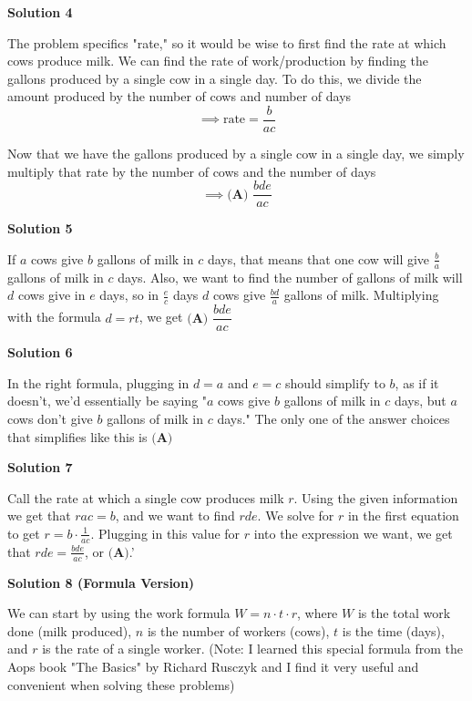 \begin{enumerate}
\textbf{Solution 4}

The problem specifics "rate," so it would be wise to first find the rate at which cows produce milk. We can find the rate of work/production by finding the gallons produced by a single cow in a single day. To do this, we divide the amount produced by the number of cows and number of days 
 \[\implies\text{rate}=\dfrac{b}{ac}\]

 Now that we have the gallons produced by a single cow in a single day, we simply multiply that rate by the number of cows and the number of days 
 \[\implies\boxed{\textbf{(A) } \dfrac{bde}{ac}}\]




\textbf{Solution 5}

If $a$ cows give $b$ gallons of milk in $c$ days, that means that one cow will give $\frac{b}{a}$ gallons of milk in $c$ days. Also, we want to find the number of gallons of milk will $d$ cows give in $e$ days, so in $\frac{e}{c}$ days $d$ cows give $\frac{bd}{a}$ gallons of milk. Multiplying with the formula $d=rt$, we get $\boxed{\textbf{(A) } \dfrac{bde}{ac}}$




\textbf{Solution 6}

In the right formula, plugging in $d=a$ and $e=c$ should simplify to $b$, as if it doesn't, we'd essentially be saying "$a$ cows give $b$ gallons of milk in $c$ days, but $a$ cows don't give $b$ gallons of milk in $c$ days." The only one of the answer choices that simplifies like this is $\boxed{\textbf{(A)}}$




\textbf{Solution 7}

Call the rate at which a single cow produces milk $r$. Using the given information we get that $rac=b$, and we want to find $rde$. We solve for $r$ in the first equation to get $r=b \cdot \frac{1}{ac}$. Plugging in this value for $r$ into the expression we want, we get that $rde=\frac{bde}{ac}$, or $\boxed{\textbf{(A)}}$.'

 



\textbf{Solution 8 (Formula Version)}

We can start by using the work formula $W = n \cdot t \cdot r$, where $W$ is the total work done (milk produced), $n$ is the number of workers (cows), $t$ is the time (days), and $r$ is the rate of a single worker. (Note: I learned this special formula from the Aops book "The Basics" by Richard Rusczyk and I find it very useful and convenient when solving these problems)


\end{enumerate}
